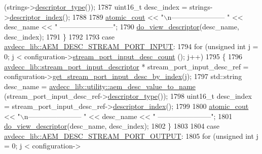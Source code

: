 \begin{DoxyCode}
      (strings->\hyperlink{classavdecc__lib_1_1descriptor__base_a5112b70022171063ec5d3242bee9910e}{descriptor\_type}());
1787             uint16\_t desc\_index = strings->\hyperlink{classavdecc__lib_1_1descriptor__base_a7eed5583bffdf72d89021b188648c1b5}{descriptor\_index}();
1788 
1789             \hyperlink{cmd__line_8h_a0bc38ccc65c79ba06c6fcd7b4bf554c3}{atomic\_cout} << \textcolor{stringliteral}{"\(\backslash\)n----------------------- "} << desc\_name << \textcolor{stringliteral}{"
       -----------------------"};
1790             \hyperlink{classcmd__line_aef7d9f8c4eff85c46e5b7aea0961bb51}{do\_view\_descriptor}(desc\_name, desc\_index);
1791         \}
1792 
1793     \textcolor{keywordflow}{case} \hyperlink{namespaceavdecc__lib_ac7b7d227e46bc72b63ee9e9aae15902fa54a680de439da84c5d5037a246d55b3f}{avdecc\_lib::AEM\_DESC\_STREAM\_PORT\_INPUT}:
1794         \textcolor{keywordflow}{for} (\textcolor{keywordtype}{unsigned} \textcolor{keywordtype}{int} j = 0; j < configuration->\hyperlink{classavdecc__lib_1_1configuration__descriptor_a836e1a36ce664bca990de217b53d36b3}{stream\_port\_input\_desc\_count}
      (); j++)
1795         \{
1796             \hyperlink{classavdecc__lib_1_1stream__port__input__descriptor}{avdecc\_lib::stream\_port\_input\_descriptor} * 
      stream\_port\_input\_desc\_ref = configuration->\hyperlink{classavdecc__lib_1_1configuration__descriptor_ad05646251e84a4024f317dd82395b8f7}{get\_stream\_port\_input\_desc\_by\_index}(j);
1797             std::string desc\_name = \hyperlink{namespaceavdecc__lib_1_1utility_a6bdd02679e5a911a071d4aa03be341f0}{avdecc\_lib::utility::aem\_desc\_value\_to\_name}
      (stream\_port\_input\_desc\_ref->\hyperlink{classavdecc__lib_1_1descriptor__base_a5112b70022171063ec5d3242bee9910e}{descriptor\_type}());
1798             uint16\_t desc\_index = stream\_port\_input\_desc\_ref->\hyperlink{classavdecc__lib_1_1descriptor__base_a7eed5583bffdf72d89021b188648c1b5}{descriptor\_index}();
1799 
1800             \hyperlink{cmd__line_8h_a0bc38ccc65c79ba06c6fcd7b4bf554c3}{atomic\_cout} << \textcolor{stringliteral}{"\(\backslash\)n----------------------- "} << desc\_name << \textcolor{stringliteral}{"
       -----------------------"};
1801             \hyperlink{classcmd__line_aef7d9f8c4eff85c46e5b7aea0961bb51}{do\_view\_descriptor}(desc\_name, desc\_index);
1802         \}
1803 
1804     \textcolor{keywordflow}{case} \hyperlink{namespaceavdecc__lib_ac7b7d227e46bc72b63ee9e9aae15902fa2b2dca37bb2c945a2b37b02231650b48}{avdecc\_lib::AEM\_DESC\_STREAM\_PORT\_OUTPUT}:
1805         \textcolor{keywordflow}{for} (\textcolor{keywordtype}{unsigned} \textcolor{keywordtype}{int} j = 0; j < configuration->

\end{DoxyCode}
